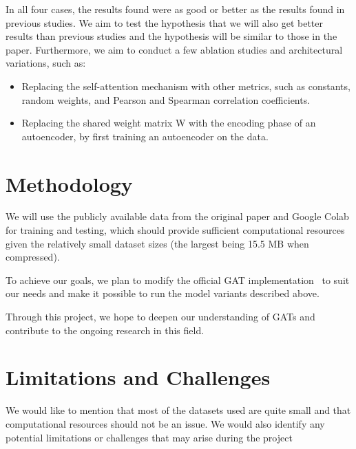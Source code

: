 \documentclass{article}
\begin{document}
    In all four cases, the results found were as good or better as the results found in previous studies.
    We aim to test the hypothesis that we will also get better results than previous studies and the hypothesis will
    be similar to those in the paper.
    Furthermore, we aim to conduct a few ablation studies and architectural
    variations, such as:
    \begin{itemize}
        \item Replacing the self-attention mechanism with other metrics, such as
    constants, random weights, and Pearson and Spearman correlation
    coefficients.
        \item Replacing the shared weight matrix W with the encoding phase of an
    autoencoder, by first training an autoencoder on the data.
    \end{itemize}

    \section{Methodology}\label{sec:methodology}
    We will use the publicly available data from the original paper and Google Colab for training and testing, which should provide sufficient computational resources given the relatively small dataset sizes (the largest being 15.5 MB when compressed).

    To achieve our goals, we plan to modify the official GAT implementation~\cite{petarvgatgithub} to suit our needs and make it
    possible to run the model variants described above.

    Through this project, we hope to deepen our understanding of GATs and contribute to the ongoing research in this field.

    \section{Limitations and Challenges}\label{sec:limitations-and-challenges}
    We would like to mention that most of the datasets used are quite small and that computational resources should
    not be an issue.
    We would also identify any potential limitations or challenges that may arise during the project

    
\end{document}
